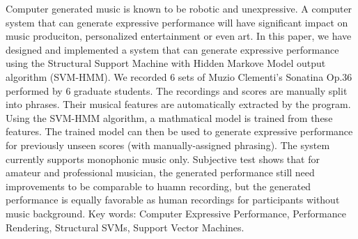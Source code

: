 \begin{abstractEN}

Computer generated music is known to be robotic and unexpressive. %
A computer system that can generate expressive performance will have significant impact on music produciton, personalized entertainment or even art. In this paper, we have designed and implemented a system that can generate expressive performance using the Structural Support Machine with Hidden Markove Model output algorithm (SVM-HMM). We recorded 6 sets of Muzio Clementi's Sonatina Op.36 performed by 6 graduate students. The recordings and scores are manually split into phrases. Their musical features are automatically extracted by the program. Using the SVM-HMM algorithm, a mathmatical model is trained from these features. The trained model can then be used to generate expressive performance for previously unseen scores (with manually-assigned phrasing). The system currently supports monophonic music only. Subjective test shows that for amateur and professional musician, the generated performance still need improvements to be comparable to huamn recording, but the generated performance is equally favorable as human recordings for participants without music background. 
Key words: Computer Expressive Performance, Performance Rendering, Structural SVMs, Support Vector Machines.

\end{abstractEN}
